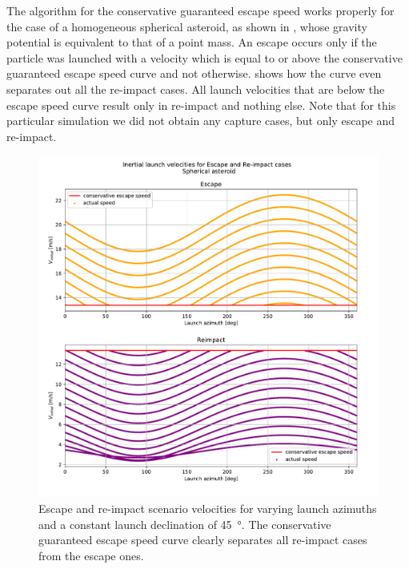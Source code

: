 \FloatBarrier
The algorithm for the conservative guaranteed escape speed works properly for the case of a homogeneous spherical asteroid, as shown in , whose gravity potential is equivalent to that of a point mass. An escape occurs only if the particle was launched with a velocity which is equal to or above the conservative guaranteed escape speed curve and not otherwise.  shows how the curve even separates out all the re-impact cases. All launch velocities that are below the escape speed curve result only in re-impact and nothing else. Note that for this particular simulation we did not obtain any capture cases, but only escape and re-impact.
\begin{figure}[htb]
\centering
\captionsetup{justification=centering}
\includegraphics[width=\textwidth, height=0.7\textheight, keepaspectratio=true]{non_conservative_escape_speed/spherical_asteroid_escape_and_capture.pdf}
\caption{Escape and re-impact scenario velocities for varying launch azimuths and a constant launch declination of \protect\SI{45}{\degree}. The conservative guaranteed escape speed curve clearly separates all re-impact cases from the escape ones.}
\label{fig:conservative_spherical_asteroid_escape_and_reimpact}
\end{figure}
\FloatBarrier


